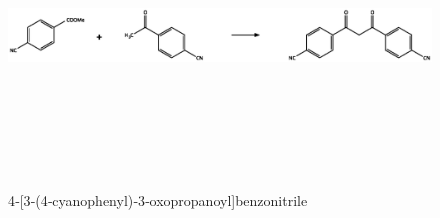 \documentclass[../Master.tex]{subfiles}
\begin{document}
\begin{figure}[h!]
	\centering
	\includegraphics[width=16cm,height=8cm,keepaspectratio]{Structures/dicn-sint.eps}\caption{4‐[3‐(4‐cyanophenyl)‐3‐oxopropanoyl]benzonitrile}
\end{figure}

\end{document}

